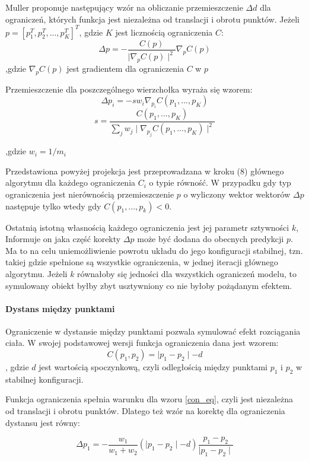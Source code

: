 Muller proponuje następujący wzór na obliczanie przemieszczenie $\Delta d$ dla
ograniczeń, których funkcja jest niezależna od translacji i obrotu punktów.
Jeżeli $p = [ p_1^T, p_2^T, ..., p_K^T]^T$, gdzie $K$ jest licznością
ograniczenia $C$:
\begin{equation} \label{con_eq}
\Delta p = - \frac{C(p)}{\mid \nabla_p C(p) \mid^2}\nabla_p C(p)
\end{equation}
,gdzie $\nabla_p C(p)$ jest gradientem dla ograniczenia $C$ w $p$

Przemieszczenie dla poszczególnego wierzchołka wyraża się wzorem:
$$\Delta p_i = -s w_i\nabla_{p_i}C(p_1, ..., p_K)$$ 
$$ s = \frac{C(p_1, ..., p_K)}{\sum_j w_j\mid \nabla_{p_j}C(p_1, ..., p_K)
	\mid^2}$$

,gdzie $w_i = 1 / m_i$

Przedstawiona powyżej projekcja jest przeprowadzana w kroku (8) głównego
algorytmu dla każdego ograniczenia $C_i$ o typie równość.
W przypadku gdy typ ograniczenia jest nierównością przemieszczenie $p$
o wyliczony wektor wektorów $\Delta p$ następuje tylko wtedy gdy $C(p_1, ...,
		p_k) < 0$.

Ostatnią istotną własnością każdego ograniczenia jest jej parametr sztywności
$k$, Informuje on jaka część korekty $\Delta p$ może być dodana do obecnych
predykcji $p$. Ma to na celu uniemożliwienie powrotu układu do jego konfiguracji
stabilnej, tzn. takiej gdzie spełnione są wszystkie ograniczenia, w jednej
iteracji głównego algorytmu. Jeżeli $k$ równałoby się jedności dla wszystkich
ograniczeń modelu, to symulowany obiekt byłby zbyt usztywniony co nie byłoby
pożądanym efektem.

\paragraph{Dystans między punktami}
Ograniczenie w dystansie między punktami pozwala symulować efekt rozciągania
ciała. W swojej podstawowej wersji funkcja ograniczenia dana jest wzorem:
$$ C(p_1, p_2) = \mid p_1 - p_2 \mid - d$$, gdzie $d$ jest wartością
spoczynkową, czyli odległością między punktami $p_1$ i $p_2$ w stabilnej
konfiguracji.

Funkcja ograniczenia spełnia warunku dla wzoru \ref{con_eq}, czyli jest
niezależna od translacji i obrotu punktów. Dlatego też wzór na korektę dla
ograniczenia dystansu jest równy:

$$\Delta p_1 = - \frac{w_1}{w_1 + w_2} (\mid p_1 - p_2 \mid - d)\frac{p_1 -
	p_2}{\mid p_1 - p_2 \mid}$$

